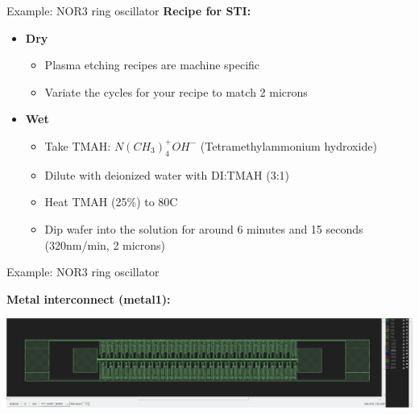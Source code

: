 \documentclass[aspectratio=169]{beamer}
\begin{document}
\begin{frame}{Example: NOR3 ring oscillator}
	\textbf{Recipe for STI:}
	\begin{itemize}
		\item\textbf{Dry}
		\begin{itemize}
			\item Plasma etching recipes are machine specific
			\item Variate the cycles for your recipe to match 2 microns
		\end{itemize}
		\item\textbf{Wet}
		\begin{itemize}
			\item Take TMAH: $ N ( CH _3 ) _4 ^{+} OH ^{−}$ (Tetramethylammonium hydroxide)
			\item Dilute with deionized water with DI:TMAH (3:1)
			\item Heat TMAH (25\%) to 80\textdegree{}C
			\item Dip wafer into the solution for around 6 minutes and 15 seconds (320nm/min, 2 microns)
		\end{itemize}
	\end{itemize}
\end{frame}

\begin{frame}{Example: NOR3 ring oscillator}
\begin{center}
	\textbf{Metal interconnect (metal1):}

	\includegraphics[width=\textwidth]{images/Screenshot_20181219_184526.png}
\end{center}
\end{frame}
\end{document}
